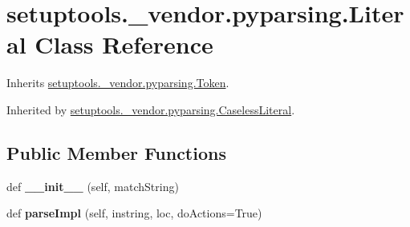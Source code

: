 \hypertarget{classsetuptools_1_1__vendor_1_1pyparsing_1_1_literal}{}\section{setuptools.\+\_\+vendor.\+pyparsing.\+Literal Class Reference}
\label{classsetuptools_1_1__vendor_1_1pyparsing_1_1_literal}


Inherits \hyperlink{classsetuptools_1_1__vendor_1_1pyparsing_1_1_token}{setuptools.\+\_\+vendor.\+pyparsing.\+Token}.



Inherited by \hyperlink{classsetuptools_1_1__vendor_1_1pyparsing_1_1_caseless_literal}{setuptools.\+\_\+vendor.\+pyparsing.\+Caseless\+Literal}.

\subsection*{Public Member Functions}
\begin{DoxyCompactItemize}
\item 
\mbox{\label{classsetuptools_1_1__vendor_1_1pyparsing_1_1_literal_a47050614e2498973e643a07c14f6029b}} 
def {\bfseries \+\_\+\+\_\+init\+\_\+\+\_\+} (self, match\+String)
\item 
\mbox{\label{classsetuptools_1_1__vendor_1_1pyparsing_1_1_literal_a0974a062784b366ec59e4e27d29d4af6}} 
def {\bfseries parse\+Impl} (self, instring, loc, do\+Actions=True)
\end{DoxyCompactItemize}
